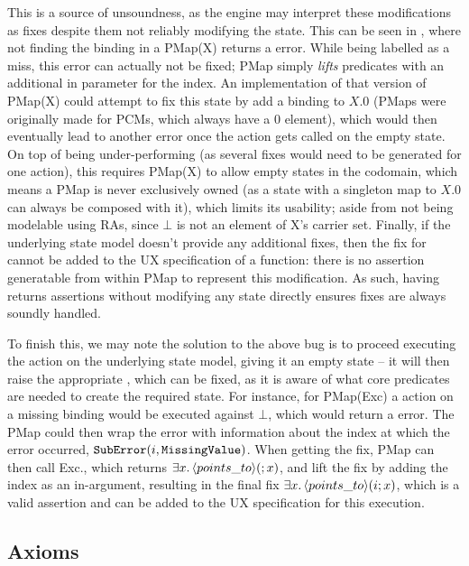 This is a source of unsoundness, as the engine may interpret these modifications as fixes despite them not reliably modifying the state. This can be seen in \cite{sacha-phd}, where not finding the binding in a PMap(X) returns a  error. While being labelled as a miss, this error can actually not be fixed; PMap simply \emph{lifts} predicates with an additional in parameter for the index. An implementation of that version of PMap(X) could attempt to fix this state by add a binding to $X.0$ (PMaps were originally made for PCMs, which always have a 0 element), which would then eventually lead to another error once the action gets called on the empty state. On top of being under-performing (as several fixes would need to be generated for one action), this requires PMap(X) to allow empty states in the codomain, which means a PMap is never exclusively owned (as a state with a singleton map to $X.0$ can always be composed with it), which limits its usability; aside from not being modelable using RAs, since $\bot$ is not an element of X's carrier set. Finally, if the underlying state model doesn't provide any additional fixes, then the fix for  cannot be added to the UX specification of a function: there is no assertion generatable from within PMap to represent this modification. As such, having \fix{} returns assertions without modifying any state directly ensures fixes are always soundly handled.

To finish this, we may note the solution to the above bug is to proceed executing the action on the underlying state model, giving it an empty state -- it will then raise the appropriate \Miss{}, which can be fixed, as it is aware of what core predicates are needed to create the required state. For instance, for PMap(Exc) a  action on a missing binding would be executed against $\bot$, which would return a  error. The PMap could then wrap the error with information about the index at which the error occurred, $\texttt{SubError}(i, \texttt{MissingValue})$. When getting the fix, PMap can then call Exc.\fix, which returns $\exists x\ldotp \left<points\_to\right>\!(;x)$, and lift the fix by adding the index as an in-argument, resulting in the final fix $\exists x\ldotp\left<points\_to\right>\!(i;x)$, which is a valid assertion and can be added to the UX specification for this execution.

\subsection{Axioms}

